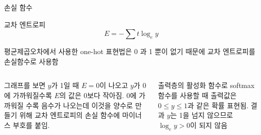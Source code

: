 \documentclass[10pt,t]{beamer}
\begin{document}
\begin{frame}{손실 함수}
\pagebreak

\begin{block}{교차 엔트로피}
    \[E = - \sum t \log_e y \]

    평균제곱오차에서 사용한 one-hot 표현법은 0 과 1 뿐이 없기 때문에 교차 엔트로피를 손실함수로 사용함
\end{block}
\vspace{1em}
\begin{columns}
    
    

 {\footnotesize 그래프를 보면 $y$가 1일 때 $E=0$이 나오고 $y$가 0에 가까워질수록 $E$의 값은 0보다 작아짐. 0에 가까워질 수록 음수가 나오는데 이것을 양수로 만들기 위해 교차 엔트로피의 손실 함수에 마이너스 부호를 붙임. 
 
 출력층의 활성화 함수로 softmax함수를 사용할 때 출력값은 $0\leq y\leq 1$과 같은 확률 표현됨. 결과 $y$는 1을 넘지 않으므로 $\log_e y >0$이 되지 않음
 }


\end{columns}

\end{frame}
\end{document}
